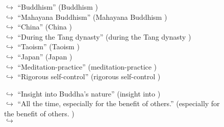 \documentclass[11pt,a4paper, onecolumn]{article}
\begin{document}
\begin{figure}[t] \small \begin{tcolorbox}[boxsep=0pt,left=5pt,right=0pt,top=2pt,colback = yellow!5] \begin{dialogue}
 \small 
\colorbox{pink!25}{$\hookrightarrow$}
{ ``Buddhism'' (Buddhism ) }
\\
\colorbox{pink!25}{$\hookrightarrow$}
{ ``Mahayana Buddhism'' (Mahayana Buddhism ) }
\\
\colorbox{pink!25}{$\hookrightarrow$}
{ ``China'' (China ) }
\\
\colorbox{pink!25}{$\hookrightarrow$}
{ ``During the Tang dynasty'' (during the Tang dynasty ) }
\\
\colorbox{pink!25}{$\hookrightarrow$}
{ ``Taoism'' (Taoism ) }
\\
\colorbox{pink!25}{$\hookrightarrow$}
{ ``Japan'' (Japan ) }
\\
\colorbox{pink!25}{$\hookrightarrow$}
{ ``Meditation-practice'' (meditation-practice ) }
\\
\colorbox{pink!25}{$\hookrightarrow$}
{ ``Rigorous self-control'' (rigorous self-control ) }
 \end{dialogue}\end{tcolorbox}\end{figure}\begin{figure}[t] \small \begin{tcolorbox}[boxsep=0pt,left=5pt,right=0pt,top=2pt,colback = yellow!5] \begin{dialogue}
 \small 
\colorbox{pink!25}{$\hookrightarrow$}
{ ``Insight into Buddha's nature'' (insight into ) }
\\
\colorbox{pink!25}{$\hookrightarrow$}
{ ``All the time, especially for the benefit of others.'' (especially for the benefit of others. ) }
\\
\colorbox{pink!25}{$\hookrightarrow$}

\end{dialogue}
\end{tcolorbox}
\end{figure}
\end{document}
